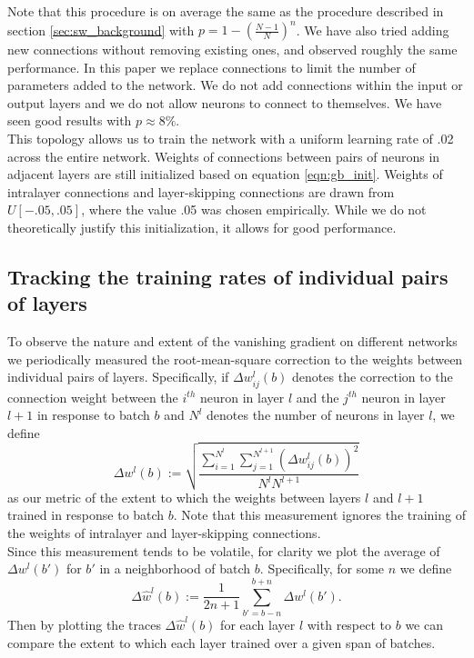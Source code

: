 \documentclass[format=sigconf]{acmart}
\newcommand{\npar}{\\\indent}
\begin{document}
Note that this procedure is on average the same as the procedure described in section \ref{sec:sw_background} with $p=1-(\frac{N-1}{N})^n$. We have also tried adding new connections without removing existing ones, and observed roughly the same performance. In this paper we replace connections to limit the number of parameters added to the network. We do not add connections within the input or output layers and we do not allow neurons to connect to themselves. We have seen good results with $p\approx 8\%$.
\npar
This topology allows us to train the network with a uniform learning rate of .02 across the entire network. Weights of connections between pairs of neurons in adjacent layers are still initialized based on equation \ref{eqn:gb_init}. Weights of intralayer connections and layer-skipping connections are drawn from $U[-.05,.05]$, where the value .05 was chosen empirically. While we do not theoretically justify this initialization, it allows for good performance.

\subsection{Tracking the training rates of individual pairs of layers}

To observe the nature and extent of the vanishing gradient on different networks we periodically measured the root-mean-square correction to the weights between individual pairs of layers. Specifically, if $\Delta w_{ij}^l(b)$ denotes the correction to the connection weight between the $i^{th}$ neuron in layer $l$ and the $j^{th}$ neuron in layer $l+1$ in response to batch $b$ and $N^l$ denotes the number of neurons in layer $l$, we define
\begin{equation}
\label{eqn:rms_correction}
\Delta w^l(b):=\sqrt{\frac{\sum_{i=1}^{N^l}\sum_{j=1}^{N^{l+1}}(\Delta w_{ij}^l(b))^2}{N^lN^{l+1}}}
\end{equation}
as our metric of the extent to which the weights between layers $l$ and $l+1$ trained in response to batch $b$. Note that this measurement ignores the training of the weights of intralayer and layer-skipping connections.
\npar
Since this measurement tends to be volatile, for clarity we plot the average of $\Delta w^l(b')$ for $b'$ in a neighborhood of batch $b$. Specifically, for some $n$ we define
\begin{equation}
\label{eqn:running_avg}
\Delta \hat{w}^l(b):=\frac{1}{2n+1}\sum_{b'=b-n}^{b+n}\Delta w^l(b').
\end{equation}
Then by plotting the traces $\Delta \hat{w}^l(b)$ for each layer $l$ with respect to $b$ we can compare the extent to which each layer trained over a given span of batches.
\end{document}
